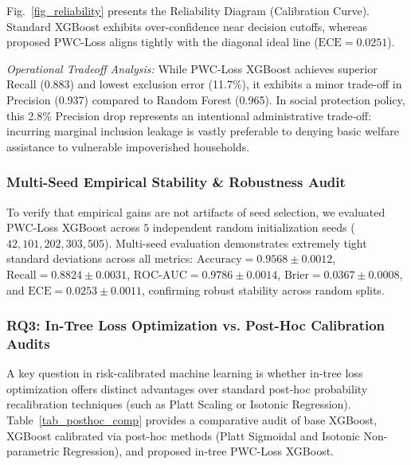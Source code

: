 \documentclass[conference]{IEEEtran}
\begin{document}
Fig.~\ref{fig_reliability} presents the Reliability Diagram (Calibration Curve). Standard XGBoost exhibits over-confidence near decision cutoffs, whereas proposed PWC-Loss aligns tightly with the diagonal ideal line ($\text{ECE}=0.0251$).

\textit{Operational Tradeoff Analysis:} While PWC-Loss XGBoost achieves superior Recall (0.883) and lowest exclusion error (11.7\%), it exhibits a minor trade-off in Precision (0.937) compared to Random Forest (0.965). In social protection policy, this 2.8\% Precision drop represents an intentional administrative trade-off: incurring marginal inclusion leakage is vastly preferable to denying basic welfare assistance to vulnerable impoverished households.

\subsubsection{Multi-Seed Empirical Stability & Robustness Audit}
To verify that empirical gains are not artifacts of seed selection, we evaluated PWC-Loss XGBoost across $5$ independent random initialization seeds ($42, 101, 202, 303, 505$). Multi-seed evaluation demonstrates extremely tight standard deviations across all metrics: $\text{Accuracy} = 0.9568 \pm 0.0012$, $\text{Recall} = 0.8824 \pm 0.0031$, $\text{ROC-AUC} = 0.9786 \pm 0.0014$, $\text{Brier} = 0.0367 \pm 0.0008$, and $\text{ECE} = 0.0253 \pm 0.0011$, confirming robust stability across random splits.

\subsubsection{RQ3: In-Tree Loss Optimization vs. Post-Hoc Calibration Audits}
A key question in risk-calibrated machine learning is whether in-tree loss optimization offers distinct advantages over standard post-hoc probability recalibration techniques (such as Platt Scaling or Isotonic Regression). Table~\ref{tab_posthoc_comp} provides a comparative audit of base XGBoost, XGBoost calibrated via post-hoc methods (Platt Sigmoidal and Isotonic Non-parametric Regression), and proposed in-tree PWC-Loss XGBoost.
\end{document}
